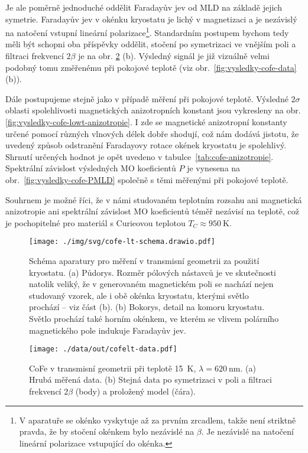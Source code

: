 Je ale poměrně jednoduché oddělit Faradayův jev od MLD na základě jejich symetrie.
Faradayův jev v okénku kryostatu je lichý v magnetizaci a je nezávislý na natočení vstupní lineární polarizace\footnote{V aparatuře se okénko vyskytuje až za prvním zrcadlem, takže není striktně pravda, že by stočení okénkem bylo nezávislé na $\beta$. Je nezávislé na natočení lineární polarizace vstupující do okénka.}.
Standardním postupem bychom tedy měli být schopni oba příspěvky oddělit, stočení po symetrizaci ve vnějším poli a filtraci frekvencí $2\beta$ je na obr. \ref{fig:vysledky-cofe-lowt-data} (b).
Výsledný signál je již vizuálně velmi podobný tomu změřenému při pokojové teplotě (viz obr.~\ref{fig:vysledky-cofe-data} (b)).

Dále postupujeme stejně jako v případě měření při pokojové teplotě.
Výsledné $2\sigma$ oblasti spolehlivosti magnetických anizotropních konstant jsou vykresleny na obr. \ref{fig:vysledky-cofe-lowt-anizotropie}.
I zde se magnetické anizotropní konstanty určené pomocí různých vlnových délek dobře shodují, což nám dodává jistotu, že uvedený způsob odstranění Faradayovy rotace okének kryostatu je spolehlivý.
Shrnutí určených hodnot je opět uvedeno v tabulce~\ref{tab:cofe-anizotropie}.
Spektrální závislost výsledných MO koeficientů $P$ je vynesena na obr.~\ref{fig:vysledky-cofe-PMLD} společně s těmi měřenými při pokojové teplotě.

Souhrnem je možné říci, že v námi studovaném teplotním rozsahu ani magnetická anizotropie ani spektrální závislost MO koeficientů téměř nezávisí na teplotě, což je pochopitelné pro materiál s Curieovou teplotou $T_C\approx \SI{950}{\kelvin}$\cite{sundarSoftMagneticFeCo2005}.


\begin{figure}[htbp]
    \centering
    \texttt{[image: ./img/svg/cofe-lt-schema.drawio.pdf]}
    \caption{Schéma aparatury pro měření v transmisní geometrii za použití kryostatu. (a) Půdorys. Rozměr pólových nástavců je ve skutečnosti natolik veliký, že v generovaném magnetickém poli se nachází nejen studovaný vzorek, ale i obě okénka kryostatu, kterými světlo prochází -- viz část (b). (b) Bokorys, detail na komoru kryostatu.
    Světlo prochází také horním okénkem, ve kterém se vlivem polárního magnetického pole indukuje Faradayův jev.}
    \label{fig:vysledky-cofe-lowt-schema}
\end{figure}

\begin{figure}[htbp]
    \centering
        \texttt{[image: ./data/out/cofelt-data.pdf]}
        \caption{CoFe v transmisní geometrii při teplotě \SI{15}{\kelvin}, $\lambda=\SI{620}{\nano\meter}$. (a) Hrubá měřená data. (b) Stejná data po symetrizaci v poli a filtraci frekvencí $2\beta$ (body) a proložený model (čára).}
    \label{fig:vysledky-cofe-lowt-data}
\end{figure}


